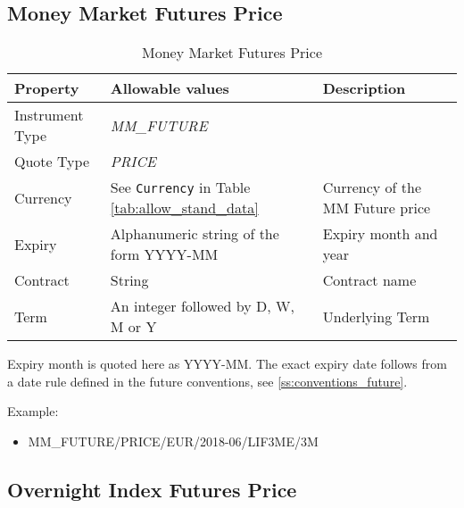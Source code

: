 \subsection{Money Market Futures Price}

\begin{table}[H]
\centering
  \begin{tabular}{|p{3cm}|p{4.5cm}|p{7cm}|}
  \hline
    {\bf Property} & {\bf Allowable values} & {\bf Description} \\ \hline
    Instrument Type & \emph{MM\_FUTURE} & \\ \hline
    Quote Type & \emph{PRICE} & \\ \hline
    Currency & See \lstinline!Currency! in Table \ref{tab:allow_stand_data}& Currency of the MM Future price\\ \hline
    Expiry & Alphanumeric string of the form YYYY-MM & Expiry month and year\\ \hline
    Contract & String & Contract name\\ \hline
    Term & An integer followed by D, W, M or Y & Underlying Term\\ \hline
  \end{tabular}
  \caption{Money Market Futures Price}
  \label{tab:mmfp_quote}
\end{table}

Expiry month is quoted here as YYYY-MM. The exact expiry date follows from a date rule defined in the future
conventions, see \ref{ss:conventions_future}.

\medskip
Example:
\begin{itemize}
\item {MM\_FUTURE/PRICE/EUR/2018-06/LIF3ME/3M}
\end{itemize}

\subsection{Overnight Index Futures Price}\label{ss:market_data_oi_index_future_prices}

